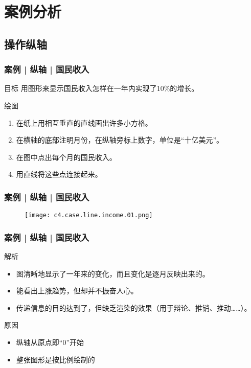 
\section{案例分析}
\subsection{操作纵轴}
\begin{frame}
  \frametitle{案例 | 纵轴 | 国民收入}
  \begin{block}{目标}
    用图形来显示国民收入怎样在一年内实现了10\%的增长。
  \end{block}
  \pause
  \begin{block}{绘图}
    \begin{enumerate}
      \item 在纸上用相互垂直的直线画出许多小方格。
      \item 在横轴的底部注明月份，在纵轴旁标上数字，单位是“十亿美元”。
      \item 在图中点出每个月的国民收入。
      \item 用直线将这些点连接起来。
    \end{enumerate}
  \end{block}
\end{frame}

\begin{frame}
  \frametitle{案例 | 纵轴 | 国民收入}
  \begin{figure}
    \centering
    \texttt{[image: c4.case.line.income.01.png]}
  \end{figure}
\end{frame}

\begin{frame}
  \frametitle{案例 | 纵轴 | 国民收入}
  \begin{block}{解析}
    \begin{itemize}
      \item 图清晰地显示了一年来的变化，而且变化是逐月反映出来的。
      \item 能看出上涨趋势，但却并不振奋人心。
      \item 传递信息的目的达到了，但缺乏渲染的效果（用于辩论、推销、推动……）。
    \end{itemize}
  \end{block}
  \pause
  \begin{block}{原因}
    \begin{itemize}
      \item 纵轴从原点即“0”开始
      \item 整张图形是按比例绘制的
    \end{itemize}
  \end{block}
\end{frame}

